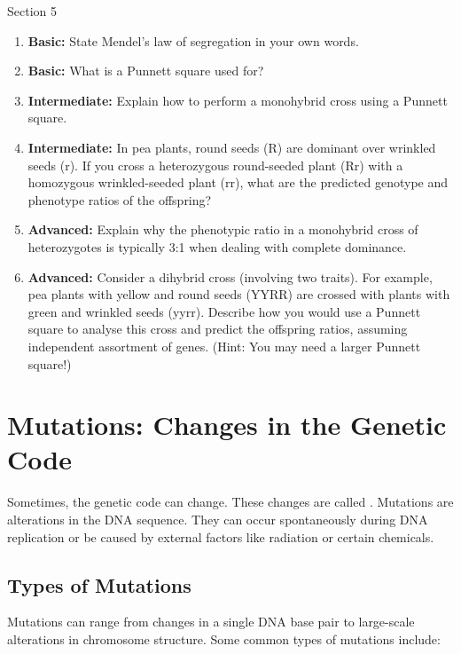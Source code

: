 \begin{tieredquestions}{Section 5}

\begin{enumerate}
    \item \textbf{Basic:} State Mendel's law of segregation in your own words.
    \item \textbf{Basic:} What is a Punnett square used for?
    \item \textbf{Intermediate:} Explain how to perform a monohybrid cross using a Punnett square.
    \item \textbf{Intermediate:} In pea plants, round seeds (R) are dominant over wrinkled seeds (r). If you cross a heterozygous round-seeded plant (Rr) with a homozygous wrinkled-seeded plant (rr), what are the predicted genotype and phenotype ratios of the offspring?
    \item \textbf{Advanced:} Explain why the phenotypic ratio in a monohybrid cross of heterozygotes is typically 3:1 when dealing with complete dominance.
    \item \textbf{Advanced:}  Consider a dihybrid cross (involving two traits). For example, pea plants with yellow and round seeds (YYRR) are crossed with plants with green and wrinkled seeds (yyrr).  Describe how you would use a Punnett square to analyse this cross and predict the offspring ratios, assuming independent assortment of genes. (Hint: You may need a larger Punnett square!)
\end{enumerate}

\end{tieredquestions}


\section{Mutations: Changes in the Genetic Code}

Sometimes, the genetic code can change. These changes are called . Mutations are alterations in the DNA sequence.  They can occur spontaneously during DNA replication or be caused by external factors like radiation or certain chemicals.

\subsection{Types of Mutations}

Mutations can range from changes in a single DNA base pair to large-scale alterations in chromosome structure.  Some common types of mutations include:

